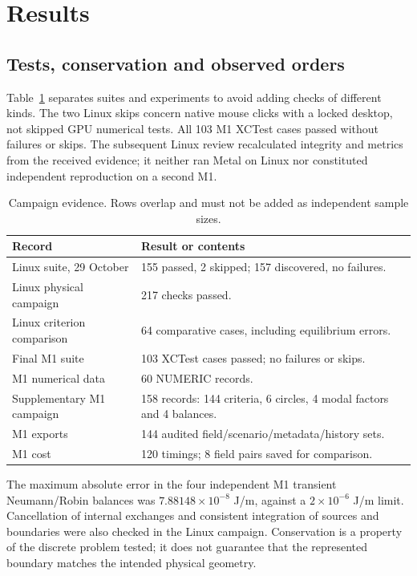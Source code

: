 \documentclass[11pt,a4paper]{article}
\begin{document}
\section{Results}
\subsection{Tests, conservation and observed orders}
Table~\ref{tab:counts} separates suites and experiments to avoid adding checks of different kinds. The two Linux skips concern native mouse clicks with a locked desktop, not skipped GPU numerical tests. All 103 M1 XCTest cases passed without failures or skips. The subsequent Linux review recalculated integrity and metrics from the received evidence; it neither ran Metal on Linux nor constituted independent reproduction on a second M1.

\begin{table}[tbp]\centering\small
\caption{Campaign evidence. Rows overlap and must not be added as independent sample sizes.}\label{tab:counts}
\begin{tabularx}{\linewidth}{@{}lX@{}}\toprule
Record & Result or contents\\\midrule
Linux suite, 29 October & 155 passed, 2 skipped; 157 discovered, no failures.\\
Linux physical campaign & 217 checks passed.\\
Linux criterion comparison & 64 comparative cases, including equilibrium errors.\\
Final M1 suite & 103 XCTest cases passed; no failures or skips.\\
M1 numerical data & 60 NUMERIC records.\\
Supplementary M1 campaign & 158 records: 144 criteria, 6 circles, 4 modal factors and 4 balances.\\
M1 exports & 144 audited field/scenario/metadata/history sets.\\
M1 cost & 120 timings; 8 field pairs saved for comparison.\\\bottomrule
\end{tabularx}
\end{table}

The maximum absolute error in the four independent M1 transient Neumann/Robin balances was $7.88148\times10^{-8}$ J/m, against a $2\times10^{-6}$ J/m limit. Cancellation of internal exchanges and consistent integration of sources and boundaries were also checked in the Linux campaign. Conservation is a property of the discrete problem tested; it does not guarantee that the represented boundary matches the intended physical geometry.
\end{document}
